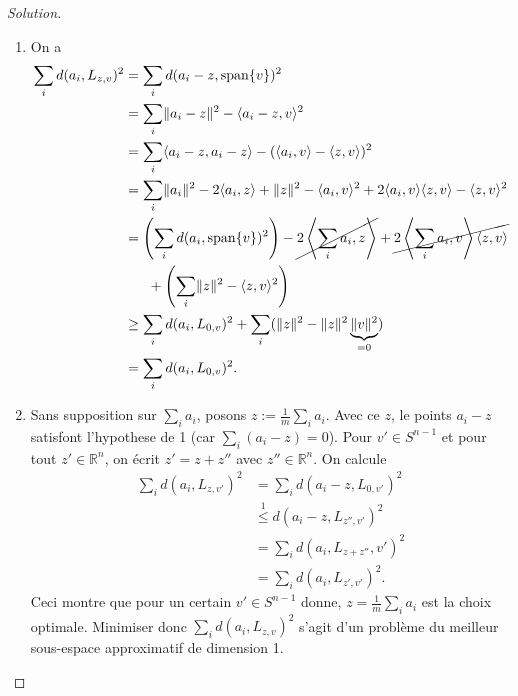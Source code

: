 \documentclass[a4paper,12pt,french]{report}
\theoremstyle{plain}
\theoremstyle{definition}
\begin{document}
\begin{proof}[Solution]
\begin{enumerate}
\item On a 
\begin{align*}
\sum _{i}d(a_{i},L_{z,v})^{2} & =\sum _{i}d(a_{i}-z,\mathrm{span}\{ v \})^{2} \\
 & =\sum _{i}\lVert a_{i}-z \rVert ^{2}-\langle a_{i}-z,v  \rangle^{2} \\
 & =\sum _{i}\langle a_{i}-z,a_{i}-z \rangle-(\langle a_{i},v \rangle -\langle z,v \rangle )^{2} \\
 & =\sum _{i}\lVert a_{i} \rVert ^{2}-2\langle a_{i},z \rangle +\lVert z \rVert ^{2} -\langle a_{i},v \rangle ^{2}+2\langle a_{i},v \rangle \langle z,v \rangle -\langle z,v \rangle ^{2} \\
 & =\left( \sum _{i}d(a_{i},\mathrm{span}\{ v \})^{2} \right)-\cancel{ 2\left\langle  \sum _{i}a_{i},z  \right\rangle }+\cancel{ 2\left\langle  \sum _{i}a_{i},v  \right\rangle\langle z,v \rangle }      \\
 & ~~~~~+\left( \sum _{i} \lVert z \rVert ^{2} -\langle z,v \rangle ^{2} \right) \\
 & \ge\sum _{i}d(a_{i},L_{0,v} )^{2}+\sum _{i}(\lVert z \rVert ^{2}-\lVert z \rVert ^{2}\underbrace{ \lVert v \rVert ^{2} }_{ =0 }) \\
 & =\sum _{i}d(a_{i},L_{0,v})^{2}.
\end{align*}
\item Sans supposition sur $\sum _{i}a_{i}$, posons $z:=\frac{1}{m}\sum _{i}a_{i}$. Avec ce $z$, le points $a_{i}-z$ satisfont l'hypothese de 1 (car $\sum _{i}(a_{i}-z)=0$). Pour $v'\in S^{n-1}$ et pour tout $z'\in \mathbb{R}^{n}$, on écrit $z'=z+z''$ avec $z''\in \mathbb{R}^{n}$. On calcule
\begin{align*}
\sum _{i}d(a_{i},L_{z,v'})^{2} & =\sum _{i}d(a_{i}-z,L_{0,v'})^{2} \\
 & \overset{1}\le d(a_{i}-z,L_{z'',v'})^{2} \\
 & =\sum _{i}d(a_{i},L_{z+z''},v')^{2} \\
 & =\sum _{i}d(a_{i},L_{z',v'})^{2}.
\end{align*}
Ceci montre que pour un certain $v'\in S^{n-1}$ donne, $z=\frac{1}{m}\sum _{i}a_{i}$ est la choix optimale. Minimiser donc $\sum _{i}d(a_{i},L_{z,v})^{2}$ s'agit d'un problème du meilleur sous-espace approximatif de dimension 1.


\end{enumerate}
\end{proof}
\end{document}
